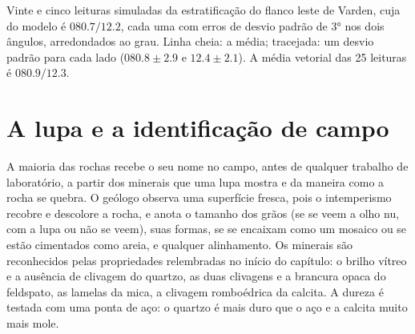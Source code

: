 \begin{omfigure}

{\small Vinte e cinco leituras simuladas da estratificação do flanco leste de Varden, cuja  do modelo é $080.7/12.2$, cada uma com erros de desvio padrão de \ang{3} nos dois ângulos, arredondados ao grau. Linha cheia: a média; tracejada: um desvio padrão para cada lado ($080.8 \pm 2.9$ e $12.4 \pm 2.1$). A média vetorial das 25 leituras é $080.9/12.3$.}
\end{omfigure}

\section{A lupa e a identificação de campo}

A maioria das rochas recebe o seu nome no campo, antes de qualquer trabalho de laboratório, a partir dos minerais que uma lupa mostra e da maneira como a rocha se quebra. O geólogo observa uma superfície fresca, pois o intemperismo recobre e descolore a rocha, e anota o tamanho dos grãos (se se veem a olho nu, com a lupa ou não se veem), suas formas, se se encaixam como um mosaico ou se estão cimentados como areia, e qualquer alinhamento. Os minerais são reconhecidos pelas propriedades relembradas no início do capítulo: o brilho vítreo e a ausência de clivagem do quartzo, as duas clivagens e a brancura opaca do feldspato, as lamelas da mica, a clivagem romboédrica da calcita. A dureza é testada com uma ponta de aço: o quartzo é mais duro que o aço e a calcita muito mais mole.

